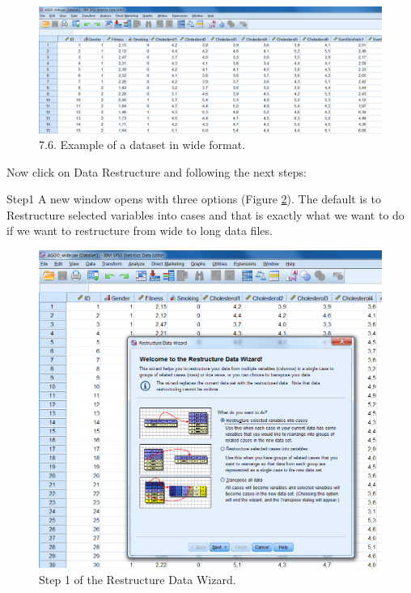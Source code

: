 \documentclass[]{book}
\theoremstyle{definition}
\theoremstyle{definition}
\theoremstyle{definition}
\theoremstyle{remark}
\begin{document}
\begin{figure}

{\centering \includegraphics[width=0.9\linewidth]{images/fig7.6} 

}

\caption{7.6. Example of a dataset in wide format.}\label{fig:fig76}
\end{figure}

Now click on Data Restructure and following the next steps:

Step1 A new window opens with three options (Figure \ref{fig:fig77}).
The default is to Restructure selected variables into cases and that is
exactly what we want to do if we want to restructure from wide to long
data files.

\begin{figure}

{\centering \includegraphics[width=0.9\linewidth]{images/fig7.7} 

}

\caption{Step 1 of the Restructure Data Wizard.}\label{fig:fig77}
\end{figure}
\end{document}
